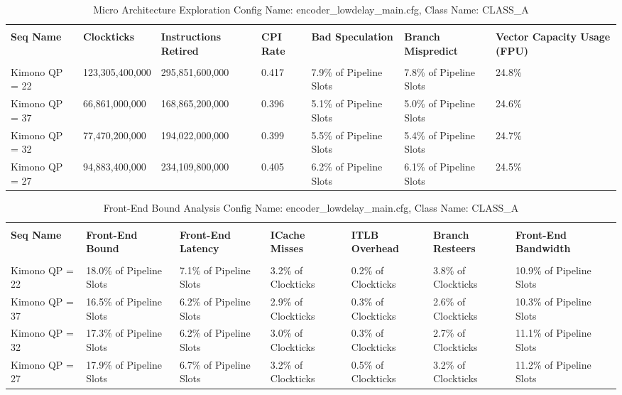 \documentclass{article}%
\begin{document}
\newpage%
\begin{longtabu}{| X[l] | X[l] | X[l] | X[l] | X[l] | X[l] | X[l] |}%
\caption{%
Micro Architecture Exploration\newline%
 Config Name: encoder\_lowdelay\_main.cfg,\newline%
 Class Name: CLASS\_A\newline%
%
}%
\hline%
&&&&&&\\%
\textbf{Seq Name}&\textbf{Clockticks}&\textbf{Instructions Retired}&\textbf{CPI Rate}&\textbf{Bad Speculation}&\textbf{Branch Mispredict}&\textbf{Vector Capacity Usage (FPU)}\\%
&&&&&&\\%
\hline%
\endhead%
Kimono\newline%
 QP = 22&123,305,400,000&295,851,600,000&0.417&7.9\% of Pipeline Slots&7.8\% of Pipeline Slots&24.8\%\\%
\hline%
Kimono\newline%
 QP = 37&66,861,000,000&168,865,200,000&0.396&5.1\% of Pipeline Slots&5.0\% of Pipeline Slots&24.6\%\\%
\hline%
Kimono\newline%
 QP = 32&77,470,200,000&194,022,000,000&0.399&5.5\% of Pipeline Slots&5.4\% of Pipeline Slots&24.7\%\\%
\hline%
Kimono\newline%
 QP = 27&94,883,400,000&234,109,800,000&0.405&6.2\% of Pipeline Slots&6.1\% of Pipeline Slots&24.5\%\\%
\hline%
\end{longtabu}%
\begin{longtabu}{| X[l] | X[l] | X[l] | X[l] | X[l] | X[l] | X[l] |}%
\caption{%
Front{-}End Bound Analysis\newline%
 Config Name: encoder\_lowdelay\_main.cfg,\newline%
 Class Name: CLASS\_A\newline%
%
}%
\hline%
&&&&&&\\%
\textbf{Seq Name}&\textbf{Front{-}End Bound}&\textbf{Front{-}End Latency}&\textbf{ICache Misses}&\textbf{ITLB Overhead}&\textbf{Branch Resteers}&\textbf{Front{-}End Bandwidth}\\%
&&&&&&\\%
\hline%
\endhead%
Kimono\newline%
 QP = 22&18.0\% of Pipeline Slots&7.1\% of Pipeline Slots&3.2\% of Clockticks&0.2\% of Clockticks&3.8\% of Clockticks&10.9\% of Pipeline Slots\\%
\hline%
Kimono\newline%
 QP = 37&16.5\% of Pipeline Slots&6.2\% of Pipeline Slots&2.9\% of Clockticks&0.3\% of Clockticks&2.6\% of Clockticks&10.3\% of Pipeline Slots\\%
\hline%
Kimono\newline%
 QP = 32&17.3\% of Pipeline Slots&6.2\% of Pipeline Slots&3.0\% of Clockticks&0.3\% of Clockticks&2.7\% of Clockticks&11.1\% of Pipeline Slots\\%
\hline%
Kimono\newline%
 QP = 27&17.9\% of Pipeline Slots&6.7\% of Pipeline Slots&3.2\% of Clockticks&0.5\% of Clockticks&3.2\% of Clockticks&11.2\% of Pipeline Slots\\%
\hline%
\end{longtabu}%
\end{document}
